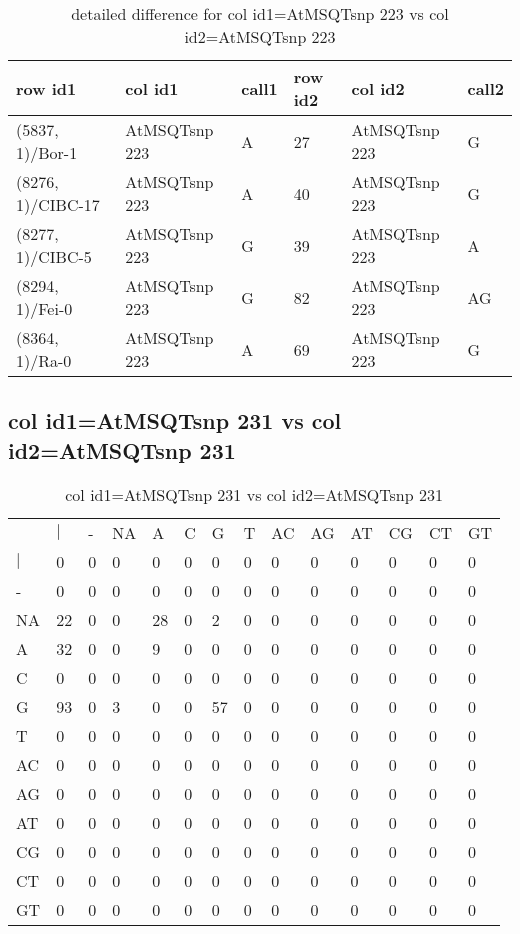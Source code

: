 \begin{center}
\begin{longtable}{|l|l|l|l|l|l|}
\caption{detailed difference for col id1=AtMSQTsnp 223 vs col id2=AtMSQTsnp 223} \label{table_dm595}\\
\hline
row id1&col id1&call1&row id2&col id2&call2\\
\hline
(5837, 1)/Bor-1&AtMSQTsnp 223&A&27&AtMSQTsnp 223&G\\
(8276, 1)/CIBC-17&AtMSQTsnp 223&A&40&AtMSQTsnp 223&G\\
(8277, 1)/CIBC-5&AtMSQTsnp 223&G&39&AtMSQTsnp 223&A\\
(8294, 1)/Fei-0&AtMSQTsnp 223&G&82&AtMSQTsnp 223&AG\\
(8364, 1)/Ra-0&AtMSQTsnp 223&A&69&AtMSQTsnp 223&G\\
\hline
\end{longtable}
\end{center}

\subsection{col id1=AtMSQTsnp 231 vs col id2=AtMSQTsnp 231}
\begin{center}
\begin{longtable}{|l|l|l|l|l|l|l|l|l|l|l|l|l|l|}
\caption{col id1=AtMSQTsnp 231 vs col id2=AtMSQTsnp 231} \label{table_dm596}\\
\hline
\\
\hline
&$|$&-&NA&A&C&G&T&AC&AG&AT&CG&CT&GT\\
$|$&0&0&0&0&0&0&0&0&0&0&0&0&0\\
-&0&0&0&0&0&0&0&0&0&0&0&0&0\\
NA&22&0&0&28&0&2&0&0&0&0&0&0&0\\
A&32&0&0&9&0&0&0&0&0&0&0&0&0\\
C&0&0&0&0&0&0&0&0&0&0&0&0&0\\
G&93&0&3&0&0&57&0&0&0&0&0&0&0\\
T&0&0&0&0&0&0&0&0&0&0&0&0&0\\
AC&0&0&0&0&0&0&0&0&0&0&0&0&0\\
AG&0&0&0&0&0&0&0&0&0&0&0&0&0\\
AT&0&0&0&0&0&0&0&0&0&0&0&0&0\\
CG&0&0&0&0&0&0&0&0&0&0&0&0&0\\
CT&0&0&0&0&0&0&0&0&0&0&0&0&0\\
GT&0&0&0&0&0&0&0&0&0&0&0&0&0\\
\hline
\end{longtable}
\end{center}

